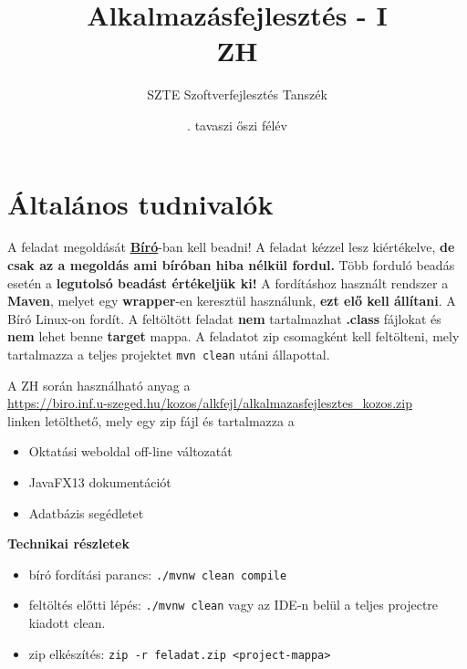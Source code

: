 \documentclass[a4paper,12pt]{article}
\begin{document}
\pagestyle{empty}
\thispagestyle{empty}

\title{\vspace{-22mm}Alkalmazásfejlesztés - I \\ZH}
\author{\vspace{-2mm}SZTE Szoftverfejlesztés Tanszék}
\date{\vspace{-2mm}\the\year{}.  {tavaszi} {őszi} félév}

\maketitle

\section{Általános tudnivalók}

A feladat megoldását \textbf{\href{https://biro.inf.u-szeged.hu/}{Bíró}}-ban kell beadni!
A feladat kézzel lesz kiértékelve, \textbf{de csak az a megoldás ami bíróban hiba nélkül fordul.}
Több forduló beadás esetén a \textbf{legutolsó beadást értékeljük ki!}
A fordításhoz használt rendszer a \textbf{Maven}, melyet egy \textbf{wrapper}-en keresztül használunk, \textbf{\color{red}ezt elő kell állítani}.
A Bíró Linux-on fordít.
A feltöltött feladat \textbf{nem} tartalmazhat \textbf{.class} fájlokat és \textbf{nem} lehet benne \textbf{target} mappa.
A feladatot zip csomagként kell feltölteni, mely tartalmazza a teljes projektet \texttt{mvn clean} utáni állapottal.

A ZH során használható anyag a \\
\url{https://biro.inf.u-szeged.hu/kozos/alkfejl/alkalmazasfejlesztes_kozos.zip}\\
linken letölthető, mely egy zip fájl és tartalmazza a
\begin{itemize}
    \item Oktatási weboldal off-line változatát
    \item JavaFX13 dokumentációt
    \item Adatbázis segédletet
\end{itemize}
\vspace{0.6cm}

\textbf{Technikai részletek}
\begin{itemize}
    \item bíró fordítási parancs: \texttt{./mvnw clean compile}
    \item feltöltés előtti lépés: \texttt{./mvnw clean} vagy az IDE-n belül a teljes projectre kiadott clean.
    \item zip elkészítés: \texttt{zip -r feladat.zip <project-mappa>}
\end{itemize}
\end{document}
